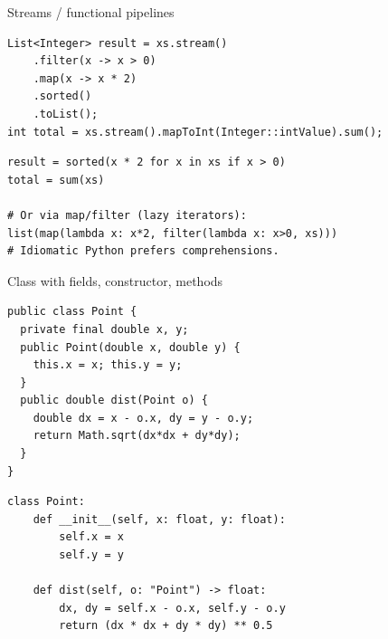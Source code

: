 \documentclass[10pt]{article}
\begin{document}
\begin{construct}{Streams / functional pipelines}
\noindent
\begin{minipage}[t]{0.485\linewidth}
\begin{lstlisting}[style=java, title=Java]
List<Integer> result = xs.stream()
    .filter(x -> x > 0)
    .map(x -> x * 2)
    .sorted()
    .toList();
int total = xs.stream().mapToInt(Integer::intValue).sum();
\end{lstlisting}
\end{minipage}\hfill
\begin{minipage}[t]{0.485\linewidth}
\begin{lstlisting}[style=python, title=Python]
result = sorted(x * 2 for x in xs if x > 0)
total = sum(xs)

# Or via map/filter (lazy iterators):
list(map(lambda x: x*2, filter(lambda x: x>0, xs)))
# Idiomatic Python prefers comprehensions.
\end{lstlisting}
\end{minipage}
\end{construct}


\begin{construct}{Class with fields, constructor, methods}
\noindent
\begin{minipage}[t]{0.485\linewidth}
\begin{lstlisting}[style=java, title=Java]
public class Point {
  private final double x, y;
  public Point(double x, double y) {
    this.x = x; this.y = y;
  }
  public double dist(Point o) {
    double dx = x - o.x, dy = y - o.y;
    return Math.sqrt(dx*dx + dy*dy);
  }
}
\end{lstlisting}
\end{minipage}\hfill
\begin{minipage}[t]{0.485\linewidth}
\begin{lstlisting}[style=python, title=Python]
class Point:
    def __init__(self, x: float, y: float):
        self.x = x
        self.y = y

    def dist(self, o: "Point") -> float:
        dx, dy = self.x - o.x, self.y - o.y
        return (dx * dx + dy * dy) ** 0.5
\end{lstlisting}
\end{minipage}
\end{construct}
\end{document}
